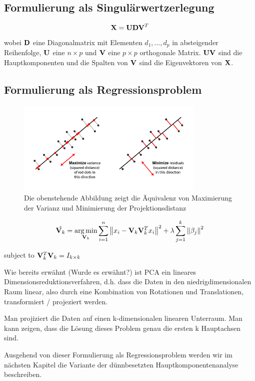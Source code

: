 \subsection{Formulierung als Singulärwertzerlegung}
$$ \mathbf{X} = \mathbf{U}\mathbf{D}\mathbf{V}^T $$
wobei $\mathbf{D}$ eine Diagonalmatrix mit Elementen $d_1,\ldots,d_p$ in absteigender Reihenfolge, $\mathbf{U}$ eine $n \times p$ und $\mathbf{V}$ eine $p \times p$ orthogonale Matrix.
$\mathbf{U}\mathbf{V}$ sind die Hauptkomponenten und die Spalten von $\mathbf{V}$ sind die Eigenvektoren von $\mathbf{X}$.

\subsection{Formulierung als Regressionsproblem}

\begin{figure}
\centering
\includegraphics[width = 0.8\textwidth]{figures/pca_projection_explanation.png}
\caption{Die obenstehende Abbildung zeigt die Äquivalenz von Maximierung der Varianz und Minimierung der Projektionsdistanz}
\label{pca_projection_explanation}
\end{figure}

$$\hat{\mathbf{V}_k} = \operatorname*{arg\,min}_{\mathbf{V}_k} \sum_{i=1}^{n} \left\lVert x_i - \mathbf{V}_k \mathbf{V}_k^Tx_i \right\rVert^2 + \lambda \sum_{j=1}^{k}\left\lVert \beta_j \right\rVert^2$$

subject to $\mathbf{V}_k^T\mathbf{V}_k = I_{k \times k}$

Wie bereits erwähnt (Wurde es erwähnt?) ist PCA ein lineares Dimensionsreduktionsverfahren, d.h. dass die Daten in den niedrigdimensionalen Raum linear, also durch eine Kombination von Rotationen und Translationen, transformiert / projeziert  werden. 

\cite{zou_sparsepca}

Man projiziert die Daten auf einen k-dimensionalen linearen Unterraum. Man kann zeigen, dass die Lösung dieses Problem genau die ersten k Hauptachsen sind.

Ausgehend von dieser Formulierung als Regressionsproblem werden wir im nächsten Kapitel die Variante der dünnbesetzten Hauptkomponentenanalyse beschreiben.

